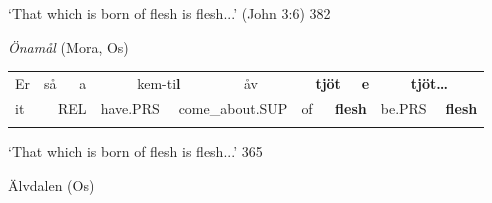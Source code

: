 \begin{styleTranslation}
‘That which is born of flesh is flesh...’ (John 3:6) 382

\end{styleTranslation}

\begin{styleExLtrTblii}
\textit{Önamål} (Mora, Os)

\end{styleExLtrTblii}

\begin{tabular}{llllllllllllllll}
\lsptoprule
Er & \multicolumn{2}{l}{så

} & \multicolumn{2}{l}{a

} & \multicolumn{2}{l}{kem-ti\textbf{l}

} & \multicolumn{2}{l}{åv

} & \multicolumn{2}{l}{{\bfseries tjöt}

} & \multicolumn{2}{l}{{\bfseries e}

} & \multicolumn{2}{l}{{\bfseries tjöt…}

} & \\
\multicolumn{2}{l}{it

} & \multicolumn{2}{l}{REL

} & \multicolumn{2}{l}{have.PRS

} & \multicolumn{2}{l}{come\_about.SUP

} & \multicolumn{2}{l}{of

} & \multicolumn{2}{l}{{\bfseries flesh}

} & \multicolumn{2}{l}{be.PRS

} & \multicolumn{2}{l}{{\bfseries flesh}

}\\
\lspbottomrule
\end{tabular}

\begin{styleTranslation}
‘That which is born of flesh is flesh...’\textbf{ }365\textbf{ }

\end{styleTranslation}


\begin{listWWNumileveli}
\item 

\end{listWWNumileveli}

\begin{listWWNumxxviiileveli}
\item 

\begin{styleExLtrTbl}
Älvdalen (Os)

\end{styleExLtrTbl}

\end{listWWNumxxviiileveli}

